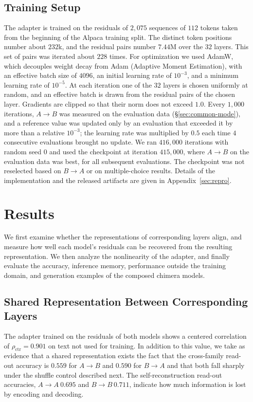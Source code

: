 \documentclass[conference]{IEEEtran}
\begin{document}
\subsection{Training Setup}\label{sec:train}
The adapter is trained on the residuals of $2{,}075$ sequences of $112$ tokens taken from the beginning of the Alpaca training split.
The distinct token positions number about $232$k, and the residual pairs number $7.44$M over the $32$ layers. This set of pairs was
iterated about $228$ times.
For optimization we used AdamW, which decouples weight decay from Adam (Adaptive Moment Estimation), with an effective batch size of
$4096$, an initial learning rate of $10^{-3}$, and a minimum learning rate of $10^{-5}$.
At each iteration one of the $32$ layers is chosen uniformly at random, and an effective batch is drawn from the residual pairs of the
chosen layer. Gradients are clipped so that their norm does not exceed $1.0$.
Every $1{,}000$ iterations, $A\!\to\!B$ was measured on the evaluation data (\S\ref{sec:common-mode}), and a reference value was updated only by
an evaluation that exceeded it by more than a relative $10^{-3}$; the learning rate was multiplied by $0.5$ each time $4$ consecutive
evaluations brought no update. We ran $416{,}000$ iterations with random seed $0$ and
used the checkpoint at iteration $415{,}000$, where $A\!\to\!B$ on the evaluation data was best, for all subsequent evaluations.
The checkpoint was not reselected based on $B\!\to\!A$ or on multiple-choice results. Details of the implementation and the released
artifacts are given in Appendix~\ref{sec:repro}.


\section{Results}\label{sec:results}
We first examine whether the representations of corresponding layers align, and measure how well each model's residuals can be
recovered from the resulting representation. We then analyze the nonlinearity of the adapter, and finally evaluate the accuracy,
inference memory, performance outside the training domain, and generation examples of the composed chimera models.

\subsection{Shared Representation Between Corresponding Layers}\label{sec:space}
The adapter trained on the residuals of both models shows a centered correlation of $\rho_{\mathrm{ctr}}\!=\!0.901$ on text not used
for training. In addition to this value, we take as evidence that a shared representation exists the fact that the cross-family
read-out accuracy is $0.559$ for $A\!\to\!B$ and $0.590$ for $B\!\to\!A$ and that both fall sharply under the shuffle control
described next. The self-reconstruction read-out accuracies, $A\!\to\!A\ 0.695$ and $B\!\to\!B\ 0.711$, indicate how much information
is lost by encoding and decoding.
\end{document}
